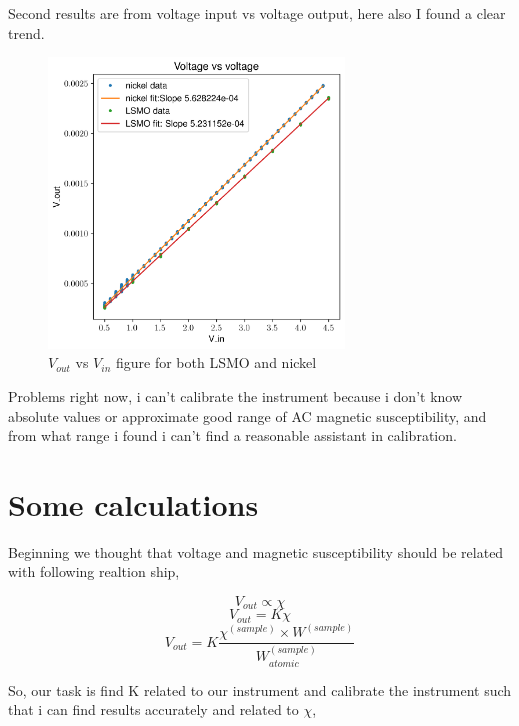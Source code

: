 \documentclass[a4paper,11pt]{article}
\begin{document}
\clearpage
Second results are from voltage input vs voltage output, here also I found a clear trend.

\begin{figure}[!hbt]\center
\includegraphics[width=0.7\textwidth]{voltage.png}
\caption{$V_{out}$ vs $V_{in}$ figure for both LSMO and nickel}
\end{figure}


\clearpage

Problems right now, i can’t calibrate the instrument because i don’t know absolute values or approximate good range of AC magnetic susceptibility, and from what range i found i can’t find a reasonable assistant in calibration. 


\section{Some calculations}
\label{sec:orgb7b3287}

Beginning we thought that voltage and magnetic susceptibility should be related with following realtion ship,

\begin{equation*}
V_{out} \propto \chi
\end{equation*}
\begin{equation*}
V_{out} = K \chi
\end{equation*}
\begin{equation*}
V_{out} = K \frac{\chi^{(sample)} \times W^{(sample)}}{W_{atomic}^{(sample)}}
\end{equation*}

So, our task is find K related to our instrument and calibrate the instrument such that i can find results accurately and related to \(\chi\),
\end{document}
